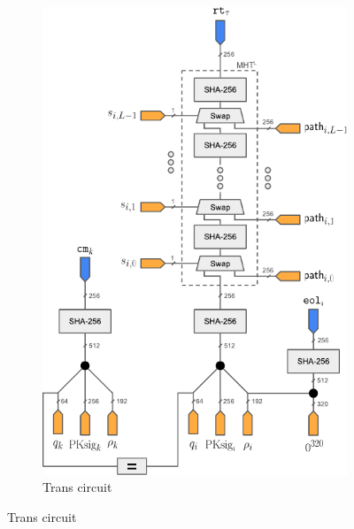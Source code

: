 \begin{figure}
\begin{subfigure}[t]{0.35\textwidth}
        \includegraphics[scale=0.6]{Figures/Trans.pdf} %
        \caption{\textsf{Trans} circuit}
        \label{fig:Transcircuits}
        

\end{subfigure}
\end{figure}
